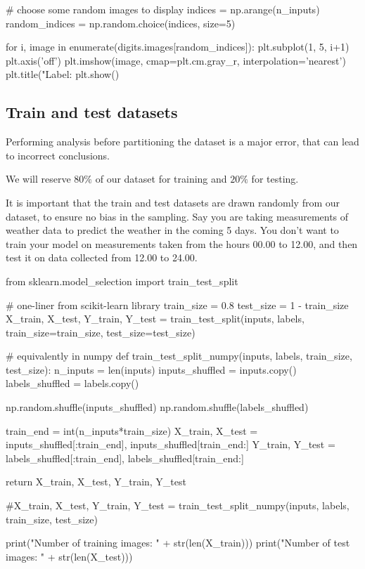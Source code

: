 \documentclass[%
oneside,                 %
final,                   %
10pt]{article}
\begin{document}
# choose some random images to display
indices = np.arange(n_inputs)
random_indices = np.random.choice(indices, size=5)

for i, image in enumerate(digits.images[random_indices]):
    plt.subplot(1, 5, i+1)
    plt.axis('off')
    plt.imshow(image, cmap=plt.cm.gray_r, interpolation='nearest')
    plt.title("Label: %
plt.show()
\epycod

\subsection{Train and test datasets}

Performing analysis before partitioning the dataset is a major error, that can lead to incorrect conclusions.  

We will reserve $80 \%$ of our dataset for training and $20 \%$ for testing.  

It is important that the train and test datasets are drawn randomly from our dataset, to ensure
no bias in the sampling.  
Say you are taking measurements of weather data to predict the weather in the coming 5 days.
You don't want to train your model on measurements taken from the hours 00.00 to 12.00, and then test it on data
collected from 12.00 to 24.00.


\bpycod
from sklearn.model_selection import train_test_split

# one-liner from scikit-learn library
train_size = 0.8
test_size = 1 - train_size
X_train, X_test, Y_train, Y_test = train_test_split(inputs, labels, train_size=train_size,
                                                    test_size=test_size)

# equivalently in numpy
def train_test_split_numpy(inputs, labels, train_size, test_size):
    n_inputs = len(inputs)
    inputs_shuffled = inputs.copy()
    labels_shuffled = labels.copy()
    
    np.random.shuffle(inputs_shuffled)
    np.random.shuffle(labels_shuffled)
    
    train_end = int(n_inputs*train_size)
    X_train, X_test = inputs_shuffled[:train_end], inputs_shuffled[train_end:]
    Y_train, Y_test = labels_shuffled[:train_end], labels_shuffled[train_end:]
    
    return X_train, X_test, Y_train, Y_test

#X_train, X_test, Y_train, Y_test = train_test_split_numpy(inputs, labels, train_size, test_size)

print("Number of training images: " + str(len(X_train)))
print("Number of test images: " + str(len(X_test)))
\epycod
\end{document}
